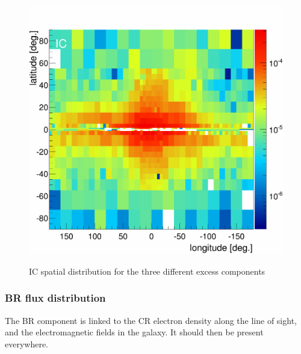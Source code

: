 \begin{figure}[h]
\begin{minipage}[h]{0.3\textwidth}
	  \label{}
  \end{minipage}
  \hfill
  \begin{minipage}[h]{0.3\textwidth}
	  \centering
	  \includegraphics[width=1.\linewidth]{pic/discussion/MSPonly_IC_integral_flux.png}
	  \label{}
  \end{minipage}
  \caption{IC spatial distribution for the three different excess components}
  \label{fig:IC_flux_distrib_excess_comp}	 
\end{figure}


\subsubsection{BR flux distribution}
The BR component is linked to the CR electron density along the line of sight, and the electromagnetic fields in the galaxy. It should then be present everywhere.


